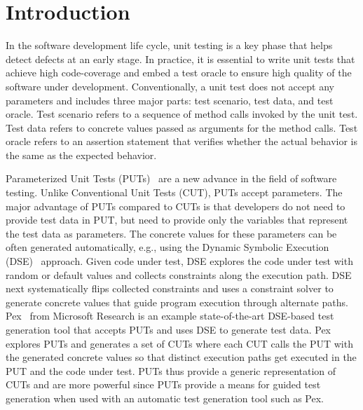 \section{Introduction}
\label{sec:intro}

In the software development life cycle, unit testing is a key phase that helps detect defects at an early stage. In practice, it is essential to write unit tests that achieve high code-coverage and embed a test oracle to ensure high quality of the software under development. Conventionally, a unit test does not accept any parameters and includes three major parts: test scenario, test data, and test oracle. Test scenario refers to a sequence of method calls invoked by the unit test. Test data refers to concrete values passed as arguments for the method calls. Test oracle refers to an assertion statement that verifies whether the actual behavior is the same as the expected behavior. 

Parameterized Unit Tests (PUTs)~\cite{tillmann05:parameterized} are a new advance in the field of software testing. Unlike Conventional Unit Tests (CUT), PUTs accept parameters. The major advantage of PUTs compared to CUTs is that developers do not need to provide test data in PUT, but need to provide only the variables that represent the test data as parameters. The concrete values for these parameters can be often generated automatically, e.g., using the Dynamic Symbolic Execution (DSE)~\cite{king:symex, godefroid05:dart, sen07:cute} approach. Given code under test, DSE explores the code under test with random or default values and collects constraints along the execution path. DSE next systematically flips collected constraints and uses a constraint solver to generate concrete values that guide program execution through alternate paths. Pex~\cite{tillmann08:pex, pex:rel} from Microsoft Research is an example state-of-the-art DSE-based test generation tool that accepts PUTs and uses DSE to generate test data. Pex explores PUTs and generates a set of CUTs where each CUT calls the PUT with the generated concrete values so that distinct execution paths get executed in the PUT and the code under test. PUTs thus provide a generic representation of CUTs and are more powerful since PUTs provide a means for guided test generation when used with an automatic test generation tool such as Pex. 

